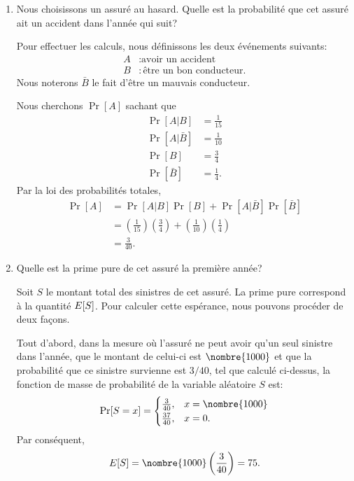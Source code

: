 \begin{enumerate}
\item Nous choisissons un assuré au hasard. Quelle est la probabilité
  que cet assuré ait un accident dans l'année qui suit?

  Pour effectuer les calculs, nous définissons les deux événements
  suivants:
  \begin{align*}
    A &: \text{avoir un accident} \\
    B &: \text{être un bon conducteur}.
  \end{align*}
  Nous noterons $\bar{B}$ le fait d'être un mauvais conducteur.

  Nous cherchons $\Pr[A]$ sachant que
  \begin{align*}
    \Pr[A|B] &= \frac{1}{15} \\
    \Pr[A|\bar{B}] &= \frac{1}{10} \\
    \Pr[B] &= \frac{3}{4} \\
    \Pr[\bar{B}] &= \frac{1}{4}.
  \end{align*}
  Par la loi des probabilités totales,
  \begin{align*}
    \Pr[A]
    &= \Pr[A|B] \Pr[B] + \Pr[A|\bar{B}] \Pr[\bar{B}] \\
    &= \left( \frac{1}{15} \right) \left( \frac{3}{4} \right)
      + \left( \frac{1}{10} \right) \left( \frac{1}{4} \right) \\
    &= \frac{3}{40}.
  \end{align*}


\item Quelle est la prime pure de cet assuré la première année?

  Soit $S$ le montant total des sinistres de cet assuré. La prime pure
  correspond à la quantité $E [ S ]$. Pour calculer cette espérance,
  nous pouvons procéder de deux façons.

  Tout d'abord, dans la mesure où l'assuré ne peut avoir qu'un seul
  sinistre dans l'année, que le montant de celui-ci est
  $\nombre{1000}$ et que la probabilité que ce sinistre survienne est
  $3/40$, tel que calculé ci-dessus, la fonction de masse de
  probabilité de la variable aléatoire $S$ est:
  \begin{equation*}
    \Pr[S = x] =
    \begin{cases}
      \frac{3}{40}, & x = \nombre{1000} \\
      \frac{37}{40}, & x = 0.
    \end{cases}
  \end{equation*}
  Par conséquent,
  \begin{equation*}
    \esp{S} = \nombre{1000} \left( \frac{3}{40} \right) = 75.
  \end{equation*}


\end{enumerate}
